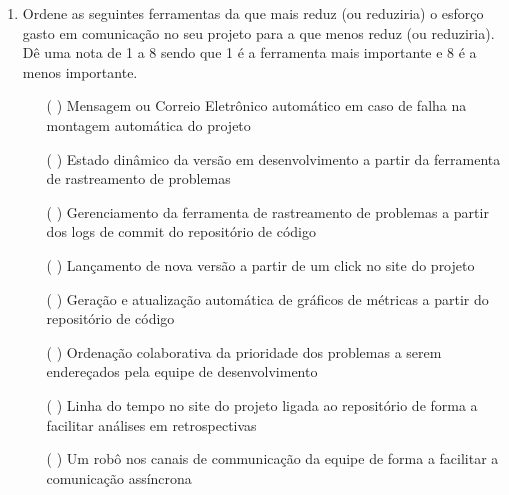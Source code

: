 \begin{enumerate}
\item Ordene as seguintes ferramentas da que mais reduz (ou reduziria)
  o esforço gasto em comunicação no seu projeto para a que menos reduz
  (ou reduziria). Dê uma nota de 1 a 8 sendo que 1 é a ferramenta mais
  importante e 8 é a menos importante.
  \begin{itemize}
  \item[( )] Mensagem ou Correio Eletrônico automático em caso de
    falha na montagem automática do projeto
  \item[( )] Estado dinâmico da versão em desenvolvimento a partir da
    ferramenta de rastreamento de problemas
  \item[( )] Gerenciamento da ferramenta de rastreamento de problemas
    a partir dos logs de commit do repositório de código
  \item[( )] Lançamento de nova versão a partir de um click no site do
    projeto
  \item[( )] Geração e atualização automática de gráficos de métricas
    a partir do repositório de código
  \item[( )] Ordenação colaborativa da prioridade dos problemas a
    serem endereçados pela equipe de desenvolvimento
  \item[( )] Linha do tempo no site do projeto ligada ao repositório
    de forma a facilitar análises em retrospectivas
  \item[( )] Um robô nos canais de communicação da equipe de forma a
    facilitar a comunicação assíncrona
  \end{itemize}
\end{enumerate}
